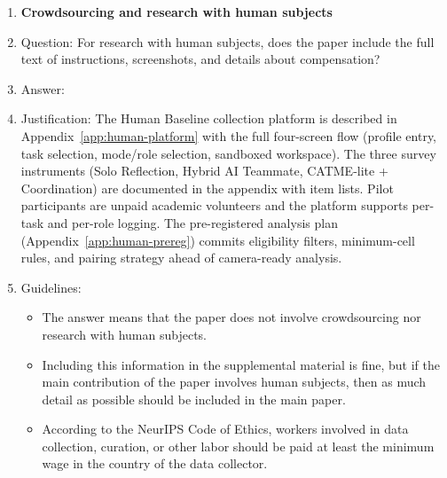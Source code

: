 \begin{enumerate}
\item {\bf Crowdsourcing and research with human subjects}
    \item[] Question: For research with human subjects, does the paper include the full text of instructions, screenshots, and details about compensation?
    \item[] Answer: \answerYes{}
    \item[] Justification: The Human Baseline collection platform is described in Appendix~\ref{app:human-platform} with the full four-screen flow (profile entry, task selection, mode/role selection, sandboxed workspace). The three survey instruments (Solo Reflection, Hybrid AI Teammate, CATME-lite + Coordination) are documented in the appendix with item lists. Pilot participants are unpaid academic volunteers and the platform supports per-task and per-role logging. The pre-registered analysis plan (Appendix~\ref{app:human-prereg}) commits eligibility filters, minimum-cell rules, and pairing strategy ahead of camera-ready analysis.
    \item[] Guidelines:
    \begin{itemize}
        \item The answer \answerNA{} means that the paper does not involve crowdsourcing nor research with human subjects.
        \item Including this information in the supplemental material is fine, but if the main contribution of the paper involves human subjects, then as much detail as possible should be included in the main paper. 
        \item According to the NeurIPS Code of Ethics, workers involved in data collection, curation, or other labor should be paid at least the minimum wage in the country of the data collector. 
    \end{itemize}


\end{enumerate}
